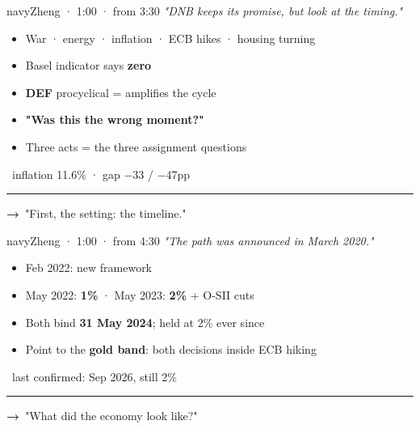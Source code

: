 \documentclass[10pt]{article}
\begin{document}
\newpage

\begin{card}{navy}{\hfill{\normalsize\mdseries Zheng · 1:00 · from 3:30}}
{\large\itshape "DNB keeps its promise, but look at the timing."}\par\smallskip
\begin{itemize}[label=\textcolor{navy}{\textbullet}]\item War · energy · inflation · ECB hikes · housing turning\item Basel indicator says \textbf{zero}\item \textcolor{gold!80!black}{\textbf{DEF}} procyclical = amplifies the cycle\item \textbf{"Was this the wrong moment?"}\item Three acts = the three assignment questions\end{itemize}
\smallskip{\color{navy}\textbf{\#}}\ inflation 11.6\% · gap −33 / −47pp\par
\vfill\textcolor{grey}{\rule{\linewidth}{0.3pt}}\par{\bfseries\color{navy}→}\ "First, the setting: the timeline."
\end{card}
\hfill
\begin{card}{navy}{\hfill{\normalsize\mdseries Zheng · 1:00 · from 4:30}}
{\large\itshape "The path was announced in March 2020."}\par\smallskip
\begin{itemize}[label=\textcolor{navy}{\textbullet}]\item Feb 2022: new framework\item May 2022: \textbf{1\%} · May 2023: \textbf{2\%} + O-SII cuts\item Both bind \textbf{31 May 2024}; held at 2\% ever since\item Point to the \textbf{gold band}: both decisions inside ECB hiking\end{itemize}
\smallskip{\color{navy}\textbf{\#}}\ last confirmed: Sep 2026, still 2\%\par
\vfill\textcolor{grey}{\rule{\linewidth}{0.3pt}}\par{\bfseries\color{navy}→}\ "What did the economy look like?"
\end{card}


\vspace{0.35cm}
\end{document}
